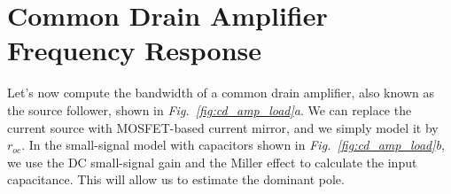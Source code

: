 \newpage
\section{Common Drain Amplifier Frequency Response}
Let's now compute the bandwidth of a common drain amplifier, also known as the source follower, shown in \emph{Fig.~\ref{fig:cd_amp_load}a}.  We can replace the current source with MOSFET-based current mirror, and we simply model it by $r_{oc}$.  In the small-signal model with capacitors shown in \emph{Fig.~\ref{fig:cd_amp_load}b}, we use the DC small-signal gain and the Miller effect to calculate the input capacitance.  This will allow us to estimate the dominant pole.
\vspace{0.5cm}
